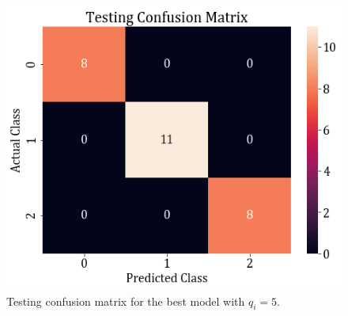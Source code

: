 \documentclass[11pt,a4paper]{article}
\begin{document}
\begin{figure}[H]
    \centering
    \includegraphics[scale=0.5]{images/1b_full_test_conf.png}
    \caption{Testing confusion matrix for the best model with $q_i=5$.}
\end{figure}
\end{document}
